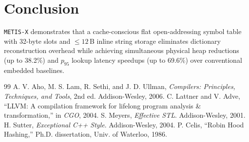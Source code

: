 \documentclass[conference]{IEEEtran}
\begin{document}
\section{Conclusion}
\texttt{METIS-X} demonstrates that a cache-conscious flat open-addressing symbol table with 32-byte slots and $\le 12$\,B inline string storage eliminates dictionary reconstruction overhead while achieving simultaneous physical heap reductions (up to 38.2\%) and $p_{95}$ lookup latency speedups (up to 69.6\%) over conventional embedded baselines.

\begin{thebibliography}{99}
 A. V. Aho, M. S. Lam, R. Sethi, and J. D. Ullman, \emph{Compilers: Principles, Techniques, and Tools}, 2nd ed. Addison-Wesley, 2006.
 C. Lattner and V. Adve, ``LLVM: A compilation framework for lifelong program analysis \& transformation,'' in \emph{CGO}, 2004.
 S. Meyers, \emph{Effective STL}. Addison-Wesley, 2001.
 H. Sutter, \emph{Exceptional C++ Style}. Addison-Wesley, 2004.
 P. Celis, ``Robin Hood Hashing,'' Ph.D. dissertation, Univ. of Waterloo, 1986.
\end{thebibliography}
\end{document}
